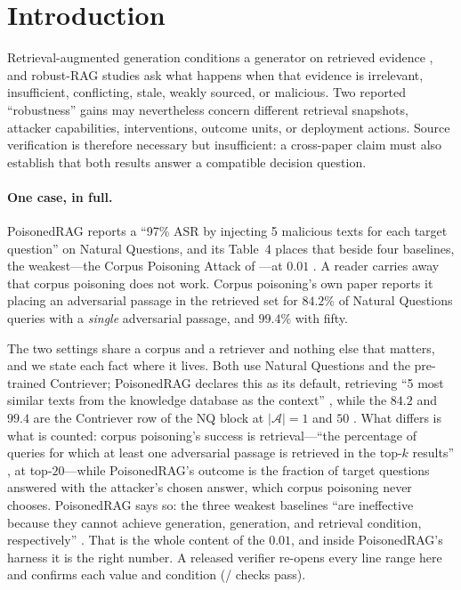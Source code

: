\documentclass[11pt]{article}
\begin{document}
\section{Introduction}
\label{sec:introduction}

Retrieval-augmented generation conditions a generator on retrieved evidence
\citep{lewis2020rag,dpr2020,realm2020}, and robust-RAG studies ask what happens
when that evidence is irrelevant, insufficient, conflicting, stale, weakly
sourced, or malicious. Two reported ``robustness'' gains may nevertheless
concern different retrieval snapshots, attacker capabilities, interventions,
outcome units, or deployment actions. Source verification is therefore
necessary but insufficient: a cross-paper claim must also establish that both
results answer a compatible decision question.

\paragraph{One case, in full.}
PoisonedRAG reports a ``97\% ASR by injecting 5 malicious texts for each target
question'' on Natural Questions, and its Table~4 places that beside four
baselines, the weakest---the Corpus Poisoning Attack of
\citet{poisoningRetrievalCorpora2023}---at $0.01$ \citep{poisonedRAG2024}. A
reader carries away that corpus poisoning does not work. Corpus poisoning's own
paper reports it placing an adversarial passage in the retrieved set for
$84.2\%$ of Natural Questions queries with a \emph{single} adversarial passage,
and $99.4\%$ with fifty.

The two settings share a corpus and a retriever and nothing else that matters,
and we state each fact where it lives. Both use Natural Questions and the
pre-trained Contriever; PoisonedRAG declares this as its default, retrieving
``5 most similar texts from the knowledge database as the context''
\citep[l.~681--684]{poisonedRAG2024}, while the $84.2$ and $99.4$ are the
Contriever row of the NQ block at $|\mathcal{A}|=1$ and $50$
\citep[l.~366--372]{poisoningRetrievalCorpora2023}. What differs is what is
counted: corpus poisoning's success is retrieval---``the percentage of queries
for which at least one adversarial passage is retrieved in the top-$k$
results'' \citep[l.~333--337]{poisoningRetrievalCorpora2023}, at top-$20$---while
PoisonedRAG's outcome is the fraction of target questions answered with the
attacker's chosen answer, which corpus poisoning never chooses. PoisonedRAG says
so: the three weakest baselines ``are ineffective because they cannot achieve
generation, generation, and retrieval condition, respectively''
\citep[l.~1338--1341]{poisonedRAG2024}. That is the whole content of the $0.01$,
and inside PoisonedRAG's harness it is the right number. A released verifier
re-opens every line range here and confirms each value and condition
(\MotivPassed{}/\MotivChecks{} checks pass).
\end{document}
